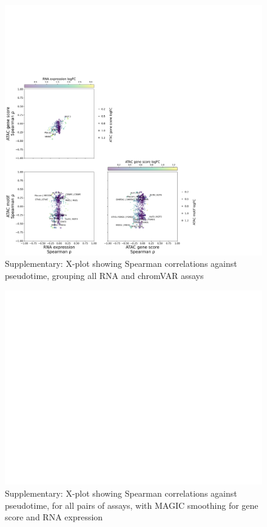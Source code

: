 \documentclass[a4paper]{article}
\begin{document}
\begin{figure}[!htb]
  \centering
  \includegraphics[width=\textwidth]{../figures/hematopoiesis/Basophil_40_109_smooth_none_grouped_X_plot.png}
  \caption{Supplementary: X-plot showing Spearman correlations against pseudotime, grouping all RNA and chromVAR assays}
\end{figure}


\begin{figure}[!htb]
  \centering
  \includegraphics[width=\textwidth]{../figures/hematopoiesis/Basophil_40_109_smooth_magic_detailed_X_plot.png}
  \caption{Supplementary: X-plot showing Spearman correlations against pseudotime, for all pairs of assays, with MAGIC smoothing for gene score and RNA expression}
\end{figure}
\end{document}
